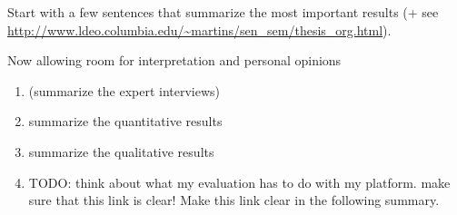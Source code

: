 	Start with a few sentences that summarize the most important results (+ see \url{http://www.ldeo.columbia.edu/~martins/sen_sem/thesis_org.html}).

	Now allowing room for interpretation and personal opinions

	\begin{enumerate}
	\item (summarize the expert interviews)
	\item summarize the quantitative results
	\item summarize the qualitative results 
	\item TODO: think about what my evaluation has to do with my platform. make sure that this link is clear! Make this link clear in the following summary.
	\end{enumerate}

